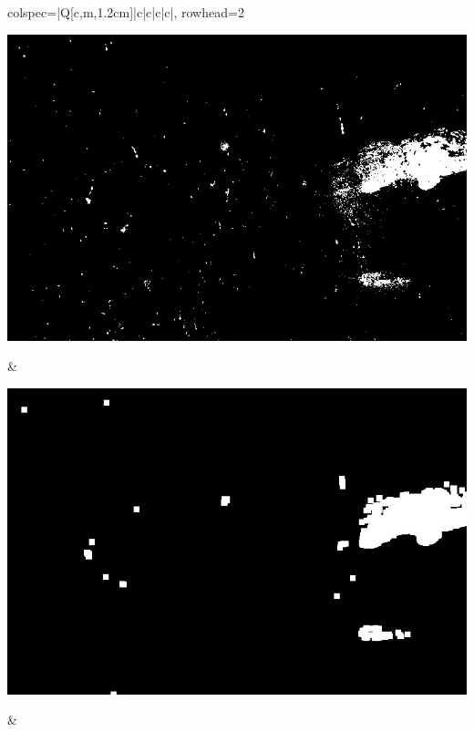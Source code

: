 \begin{longtblr}[
            caption = {Hasil uji coba proses \textit{background subtraction} menggunakan GMM yang disempurnakan oleh Operasi Morfologi},
            label = {tab:gmm_morph_9908}
        ]{
            colspec={|Q[c,m,1.2cm]|c|c|c|c|},
            rowhead=2
        }
\begin{minipage}{0.19\textwidth}
                \includegraphics[width=\linewidth]{image/9908/9908_gmm_frame290.jpg}
            \end{minipage} & 
            \begin{minipage}{0.19\textwidth}
                \includegraphics[width=\linewidth]{image/9908/9908_dilated_3x9_frame290.jpg}
            \end{minipage} &
            \begin{minipage}{0.19\textwidth}

\end{minipage}
\end{longtblr}
